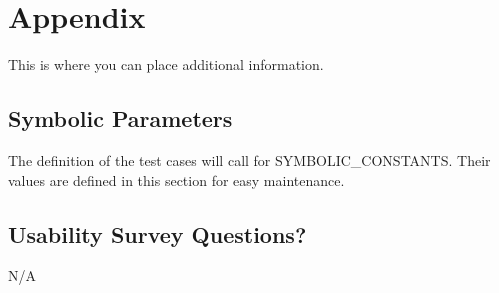 \documentclass[12pt, titlepage]{article}
\begin{document}




\newpage

\section{Appendix}

This is where you can place additional information.

\subsection{Symbolic Parameters}

The definition of the test cases will call for SYMBOLIC\_CONSTANTS.
Their values are defined in this section for easy maintenance.

\subsection{Usability Survey Questions?}

N/A
\end{document}
